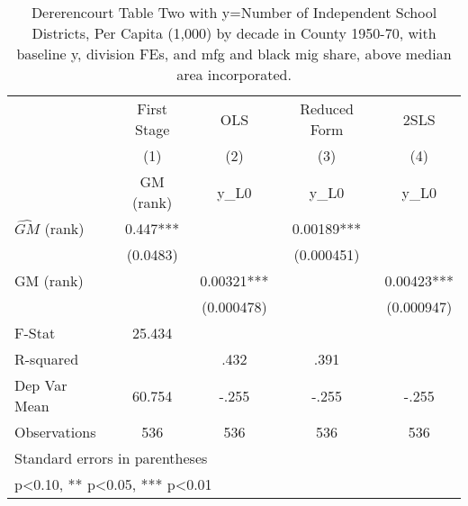 \begin{table}[htbp]\centering
\def\sym#1{\ifmmode^{#1}\else\(^{#1}\)\fi}
\caption{Dererencourt Table Two with y=Number of Independent School Districts, Per Capita (1,000) by decade in County 1950-70, with baseline y, division FEs, and mfg and black mig share, above median area incorporated.}
\begin{tabular}{l*{4}{c}}
\toprule
                    & First Stage   &         OLS   &Reduced Form   &        2SLS   \\
                    &\multicolumn{1}{c}{(1)}&\multicolumn{1}{c}{(2)}&\multicolumn{1}{c}{(3)}&\multicolumn{1}{c}{(4)}\\
                    &\multicolumn{1}{c}{GM  (rank)}&\multicolumn{1}{c}{y\_L0}&\multicolumn{1}{c}{y\_L0}&\multicolumn{1}{c}{y\_L0}\\
\midrule
$\hat{GM}$ (rank)   &       0.447***&               &     0.00189***&               \\
                    &    (0.0483)   &               &  (0.000451)   &               \\
\addlinespace
GM  (rank)          &               &     0.00321***&               &     0.00423***\\
                    &               &  (0.000478)   &               &  (0.000947)   \\
\midrule
F-Stat              &      25.434   &               &               &               \\
R-squared           &               &        .432   &        .391   &               \\
Dep Var Mean        &      60.754   &       -.255   &       -.255   &       -.255   \\
Observations        &         536   &         536   &         536   &         536   \\
\bottomrule
\multicolumn{5}{l}{\footnotesize Standard errors in parentheses}\\
\multicolumn{5}{l}{\footnotesize * p<0.10, ** p<0.05, *** p<0.01}\\
\end{tabular}
\end{table}
